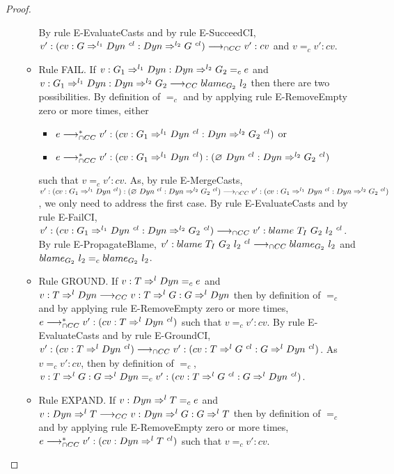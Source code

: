 \documentclass[a4paper]{article}
\begin{document}
\begin{proof}
\begin{itemize}
\begin{itemize}
        By rule E-EvaluateCasts and by rule E-SucceedCI, $v' : (cv : G \Rightarrow^{l_1} Dyn\ ^{cl} : Dyn \Rightarrow^{l_2} G\ ^{cl}) \longrightarrow_{\cap CC} v' : cv$ and $v =_c v' : cv$.
        \item Rule FAIL.
        If $v : G_1 \Rightarrow^{l_1} Dyn : Dyn \Rightarrow^{l_2} G_2 =_c e$ and $v : G_1 \Rightarrow^{l_1} Dyn : Dyn \Rightarrow^{l_2} G_2 \longrightarrow_{CC} blame_{G_2}\ l_2$ then there are two possibilities.
        By definition of $=_c$ and by applying rule E-RemoveEmpty zero or more times, either
        \begin{itemize}
            \item $e \gios^* v' : (cv : G_1 \Rightarrow^{l_1} \Dyn\ ^{cl} : \Dyn \Rightarrow^{l_2} G_2\ ^{cl})$ or
            \item $e \longrightarrow_{\cap CC}^* v' : (cv : G_1 \Rightarrow^{l_1} Dyn\ ^{cl}) : (\varnothing\ Dyn\ ^{cl} : Dyn \Rightarrow^{l_2} G_2\ ^{cl})$
        \end{itemize}
        such that $v =_c v' : cv$.
        As, by rule E-MergeCasts, $v' : (cv : G_1 \Rightarrow^{l_1} Dyn\ ^{cl}) : (\varnothing\ Dyn\ ^{cl} : Dyn \Rightarrow^{l_2} G_2\ ^{cl}) \longrightarrow_{\cap CC} v' : (cv : G_1 \Rightarrow^{l_1} Dyn\ ^{cl} : Dyn \Rightarrow^{l_2} G_2\ ^{cl})$, we only need to address the first case.
        By rule E-EvaluateCasts and by rule E-FailCI, $v' : (cv : G_1 \Rightarrow^{l_1} Dyn\ ^{cl} : Dyn \Rightarrow^{l_2} G_2\ ^{cl}) \longrightarrow_{\cap CC} v' : blame\ T_I\ G_2\ l_2\ ^{cl}$.
        By rule E-PropagateBlame, $v' : blame\ T_I\ G_2\ l_2\ ^{cl} \longrightarrow_{\cap CC} blame_{G_2}\ l_2$ and $blame_{G_2}\ l_2 =_c blame_{G_2}\ l_2$.
        \item Rule GROUND.
        If $v : T \Rightarrow^l Dyn =_c e$ and $v : T \Rightarrow^l Dyn \longrightarrow_{CC} v : T \Rightarrow^l G : G \Rightarrow^l Dyn$ then by definition of $=_c$ and by applying rule E-RemoveEmpty zero or more times, $e \gios^* v' : (cv : T \Rightarrow^l \Dyn\ ^{cl})$ such that $v =_c v' : cv$.
        By rule E-EvaluateCasts and by rule E-GroundCI, $v' : (cv : T \Rightarrow^l Dyn\ ^{cl}) \longrightarrow_{\cap CC} v' : (cv : T \Rightarrow^l G\ ^{cl} : G \Rightarrow^l Dyn\ ^{cl})$.
        As $v =_c v' : cv$, then by definition of $=_c$, $v : T \Rightarrow^l G : G \Rightarrow^l \Dyn =_c v' : (cv : T \Rightarrow^l G\ ^{cl} : G \Rightarrow^l \Dyn\ ^{cl})$.
        \item Rule EXPAND.
        If $v : Dyn \Rightarrow^l T =_c e$ and $v : Dyn \Rightarrow^l T \longrightarrow_{CC} v : Dyn \Rightarrow^l G : G \Rightarrow^l T$ then by definition of $=_c$ and by applying rule E-RemoveEmpty zero or more times, $e \gios^* v' : (cv : \Dyn \Rightarrow^l T\ ^{cl})$ such that $v =_c v' : cv$.

\end{itemize}
\end{itemize}
\end{proof}
\end{document}
